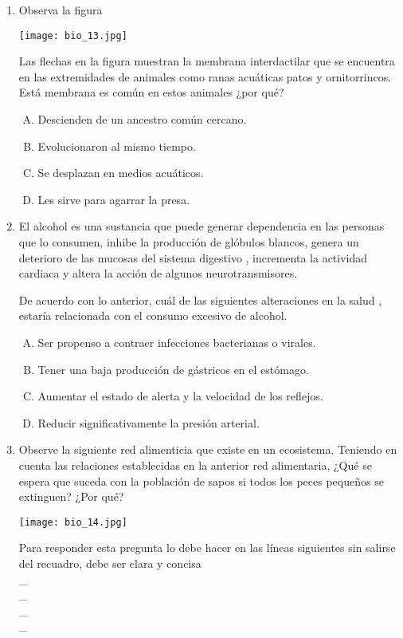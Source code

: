 \begin{enumerate}
\item Observa la  figura \label{bio-22}\\[-1.1cm]
\begin{center}
\texttt{[image: bio\_13.jpg]} 
\end{center}
Las  flechas    en la figura    muestran  la membrana   interdactilar  que se encuentra en las extremidades de animales  como ranas  acuáticas patos    y ornitorrincos. Está membrana  es común   en estos  animales ¿por qué?
\begin{enumerate}[(A)]
\item Descienden   de  un ancestro común  cercano.
\item Evolucionaron al mismo tiempo.
\item Se desplazan en medios acuáticos.
\item Les sirve para agarrar la presa.
\end{enumerate}
\item El  alcohol   es  una  sustancia  que  puede generar  dependencia en  las  personas  que  lo  consumen, inhibe  la  producción  de glóbulos blancos, genera un deterioro  de las mucosas  del   sistema  digestivo , incrementa la  actividad  cardiaca  y  altera la acción  de  algunos  neurotransmisores. \label{bio-21}

De  acuerdo  con  lo  anterior,  cuál  de las  siguientes  alteraciones en  la  salud , estaría  relacionada  con el consumo  excesivo  de  alcohol.

\begin{enumerate}[(A)]
\item Ser  propenso a contraer  infecciones  bacterianas o  virales.
\item Tener  una baja producción  de  gástricos  en el estómago.
\item Aumentar  el  estado  de  alerta  y la  velocidad  de los  reflejos.
\item Reducir significativamente  la  presión   arterial.
\end{enumerate}

\item Observe la siguiente red alimenticia que existe en un ecosistema. Teniendo en cuenta las relaciones establecidas en la anterior red alimentaria, ¿Qué se espera que suceda con la población de sapos si todos los peces pequeños se extinguen? ¿Por qué? \label{bio-25}
\begin{center}
\texttt{[image: bio\_14.jpg]} 
\end{center}
Para responder esta pregunta lo debe hacer en las líneas siguientes sin salirse del recuadro, debe ser clara y concisa  \hrulefill\\
\_\hrulefill\\
\_\hrulefill\\
\_\hrulefill\hrulefill\\
\_\hrulefill


\end{enumerate}

